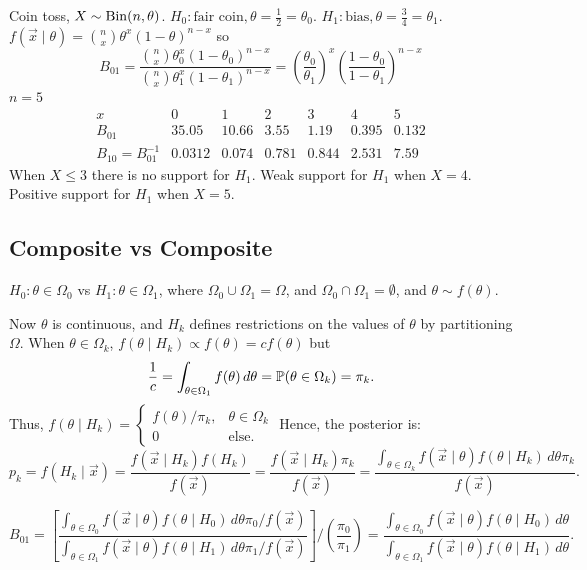\documentclass[10pt, a4paper]{article}
\begin{document}
\begin{example}
    Coin toss,
    $X \sim \Bin(n, \theta)$.
    $H_0 : \text{fair coin}, \theta = \frac{1}{2} = \theta_0$.
    $H_1 : \text{bias}, \theta = \frac{3}{4} = \theta_1$.
    $f(\vec{x} \mid \theta) = \binom{n}{x}\theta ^ x(1 - \theta) ^ {n - x}$ so
    \[
    B_{01} = \frac{\binom{n}{x}\theta_0 ^ x(1 - \theta_0) ^ {n - x}}{\binom{n}{x}\theta_1 ^ x(1 - \theta_1) ^ {n - x}} = \left(\frac{\theta_0}{\theta_1}\right) ^ x\left(\frac{1 - \theta_0}{1 - \theta_1}\right) ^ {n - x}
    \]
    $n = 5$
    \[
    \begin{array}{c|cccccc}
         x & 0 & 1 & 2 & 3 & 4 & 5  \\
         \hline
         B_{01} & 35.05 & 10.66 & 3.55 & 1.19 & 0.395 & 0.132 \\
         B_{10} = B_{01} ^ {-1} & 0.0312 & 0.074 & 0.781 & 0.844 & 2.531 & 7.59
    \end{array}
    \]
    When $X \leq 3$ there is no support for $H_1$.
    Weak support for $H_1$ when $X = 4$.
    Positive support for $H_1$ when $X = 5$.
\end{example}

\subsection{Composite vs Composite}
$H_0 : \theta \in \Omega_0$ vs $H_1 : \theta \in \Omega_1$,
where $\Omega_0 \cup \Omega_1 = \Omega$,
and $\Omega_0 \cap \Omega_1 = \emptyset$,
and $\theta \sim f(\theta)$.

Now $\theta$ is continuous,
and $H_k$ defines restrictions on the values of $\theta$ by partitioning $\Omega$.
When $\theta \in \Omega_k$,
$f(\theta \mid H_k) \propto f(\theta) = cf(\theta)$ but
\[
\frac{1}{c} = \int_{\theta \in \Omega_1}f(\theta)\,d\theta = \P(\theta \in \Omega_k) = \pi_k.
\]
Thus,
$f(\theta \mid H_k) = \begin{cases}
    f(\theta) / \pi_k, &\theta \in \Omega_k \\
    0 &\text{else}.
\end{cases}$
Hence,
the posterior is:
\[
p_k = f(H_k \mid \vec{x}) = \frac{f(\vec{x} \mid H_k)f(H_k)}{f(\vec{x})} = \frac{f(\vec{x} \mid H_k)\pi_k}{f(\vec{x})} = \frac{\int_{\theta \in \Omega_k} f(\vec{x} \mid \theta)f(\theta \mid H_k)\,d\theta \pi_k}{f(\vec{x})}.
\]

\begin{proposition}
    \[
    B_{01} = \left[\frac{\int_{\theta \in \Omega_0}f(\vec{x} \mid \theta)f(\theta \mid H_0)\,d\theta \pi_0 / f(\vec{x})}{\int_{\theta \in \Omega_1}f(\vec{x} \mid \theta)f(\theta \mid H_1)\,d\theta \pi_1 / f(\vec{x})}\right] \Bigr/\left(\frac{\pi_0}{\pi_1}\right) = \frac{\int_{\theta \in \Omega_0}f(\vec{x} \mid \theta)f(\theta \mid H_0)\,d\theta}{\int_{\theta \in \Omega_1}f(\vec{x} \mid \theta)f(\theta \mid H_1)\,d\theta}.
    \]
\end{proposition}
\end{document}
